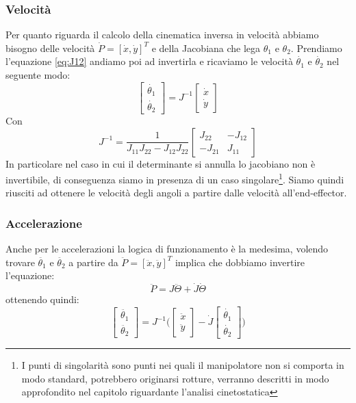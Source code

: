 \subsubsection{Velocità}
Per quanto riguarda il calcolo della cinematica inversa in velocità abbiamo bisogno delle velocità $\dot{P} = [\dot{x},\dot{y}]^T$ e della Jacobiana che lega $\theta_1$ e $\theta_2$. Prendiamo l'equazione \ref{eq:J12} andiamo poi ad invertirla e ricaviamo le velocità $\dot{\theta_1}$ e $\dot{\theta_2}$ nel seguente modo:
\begin{equation}
   \begin{bmatrix} \dot{\theta_1} \\ \dot{\theta_2}  \end{bmatrix} 
    = J^{-1} \begin{bmatrix} \dot{x} \\ \dot{y} \end{bmatrix}
\end{equation}
Con
\begin{equation}
	J^{-1} = \frac{1}{J_{11}J_{22}-J_{12}J_{22}
	}\begin{bmatrix}
		J_{22} & -J_{12} \\ -J_{21} & J_{11}
\end{bmatrix}
\end{equation} 
In particolare nel caso in cui il determinante si annulla lo jacobiano non è invertibile, di conseguenza siamo in presenza di un caso singolare\footnote{I punti di singolarità sono punti nei quali il manipolatore non si comporta in modo standard, potrebbero originarsi rotture, verranno descritti in modo approfondito nel capitolo riguardante l'analisi cinetostatica}.
Siamo quindi riusciti ad ottenere le velocità degli angoli a partire dalle velocità all'end-effector.
\subsubsection{Accelerazione}
Anche per le accelerazioni la logica di funzionamento è la medesima, volendo trovare $\ddot{\theta_1}$ e $\ddot{\theta_2}$ a partire da $\ddot{P} = [\ddot{x},\ddot{y}]^T$ implica che dobbiamo invertire l'equazione:
\begin{equation*}
	\ddot{P} = J\ddot{\Theta} + \dot{J}\dot{\Theta}
\end{equation*}
ottenendo quindi:
\begin{equation}
	\begin{bmatrix}
		\ddot{\theta_1} \\ \ddot{\theta_2}
	\end{bmatrix} =  J^{-1}\bigg(\begin{bmatrix} \ddot{x} \\ \ddot{y} \end{bmatrix}-\dot{J}\begin{bmatrix}
	\dot{\theta_1} \\ \dot{\theta_2}
\end{bmatrix}\bigg)
\end{equation}
